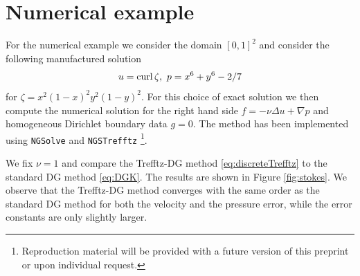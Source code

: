 \documentclass[sn-mathphys,Numbered]{sn-jnl}%
\theoremstyle{remark}%
\theoremstyle{definition}%
\begin{document}

\section{Numerical example}\label{sec:num}

For the numerical example we consider the domain $[0,1]^2$ and consider the following manufactured solution
\begin{align*}
u=\operatorname{\mathrm{curl}} \zeta,\ p=x^6+y^6 - 2/7
\end{align*}
for $\zeta= x^2 (1-x)^2  y^2  (1-y)^2$.
For this choice of exact solution we then compute the numerical solution for the right hand side $f=-\nu \Delta u + \nabla p$ and homogeneous Dirichlet boundary data $g=0$.
The method has been implemented using \texttt{NGSolve} \cite{ngsolve} and \texttt{NGSTrefftz} \cite{ngstrefftz} \footnote{Reproduction material will be provided with a future version of this preprint or upon individual request.}.



We fix $\nu=1$ and compare the Trefftz-DG method \eqref{eq:discreteTrefftz} to the standard DG method \eqref{eq:DGK}.
The results are shown in Figure \ref{fig:stokes}.
We observe that the Trefftz-DG method converges with the same order as the standard DG method for both the velocity and the pressure error, while the error constants are only slightly larger. 
\end{document}
